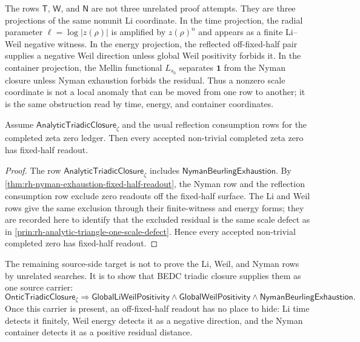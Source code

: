 \begin{principle}
\label{prin:rh-analytic-triangle-one-scale-defect}
The rows $\mathsf T$, $\mathsf W$, and $\mathsf N$ are not three
unrelated proof attempts.  They are three projections of the same
nonunit Li coordinate.  In the time projection, the radial parameter
$\ell=\log|z(\rho)|$ is amplified by $z(\rho)^n$ and appears as a
finite Li--Weil negative witness.  In the energy projection, the
reflected off-fixed-half pair supplies a negative Weil direction unless
global Weil positivity forbids it.  In the container projection, the
Mellin functional $L_{s_0}$ separates $\mathbf 1$ from the Nyman closure
unless Nyman exhaustion forbids the residual.  Thus a nonzero scale
coordinate is not a local anomaly that can be moved from one row to
another; it is the same obstruction read by time, energy, and container
coordinates.
\end{principle}

\begin{theorem}
\label{thm:rh-analytic-triadic-closure-fixed-half-readout}
Assume $\mathsf{AnalyticTriadicClosure}_{\zeta}$ and the usual
reflection consumption rows for the completed zeta zero ledger.  Then
every accepted non-trivial completed zeta zero has fixed-half readout.
\end{theorem}

\begin{proof}
The row $\mathsf{AnalyticTriadicClosure}_{\zeta}$ includes
$\mathsf{NymanBeurlingExhaustion}$.  By
\autoref{thm:rh-nyman-exhaustion-fixed-half-readout}, the Nyman row and
the reflection consumption row exclude zero readouts off the fixed-half
surface.  The Li and Weil rows give the same exclusion through their
finite-witness and energy forms; they are recorded here to identify that
the excluded residual is the same scale defect as in
\autoref{prin:rh-analytic-triangle-one-scale-defect}.  Hence every
accepted non-trivial completed zero has fixed-half readout.
\end{proof}

\begin{principle}
\label{prin:rh-ontic-closure-target-analytic-triangle}
The remaining source-side target is not to prove the Li, Weil, and
Nyman rows by unrelated searches.  It is to show that BEDC triadic
closure supplies them as one source carrier:
$$
\mathsf{OnticTriadicClosure}_{\zeta}
\Longrightarrow
\mathsf{GlobalLiWeilPositivity}
\wedge
\mathsf{GlobalWeilPositivity}
\wedge
\mathsf{NymanBeurlingExhaustion}.
$$
Once this carrier is present, an off-fixed-half readout has no place to
hide: Li time detects it finitely, Weil energy detects it as a negative
direction, and the Nyman container detects it as a positive residual
distance.
\end{principle}

